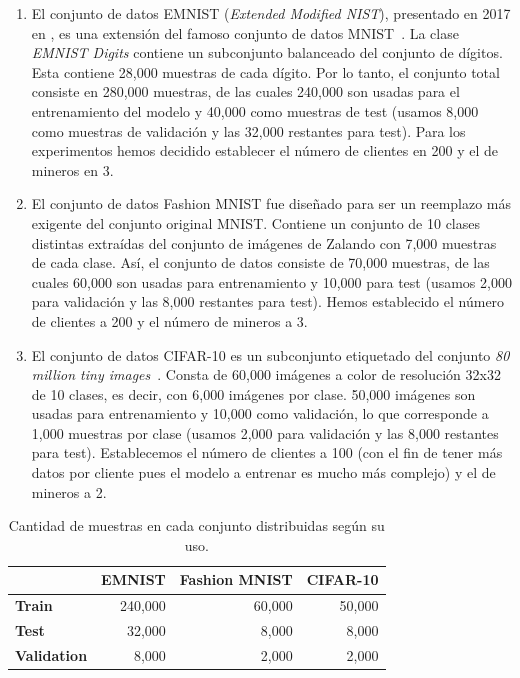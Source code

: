 \begin{enumerate}
    \item El conjunto de datos EMNIST (\textit{Extended Modified NIST}), presentado en 2017 en \cite{emnist}, es una extensión del famoso conjunto de datos MNIST~\cite{lecun-1998}. La clase \textit{EMNIST Digits} contiene un subconjunto balanceado del conjunto de dígitos. Esta contiene 28,000 muestras de cada dígito. Por lo tanto, el conjunto total consiste en 280,000 muestras, de las cuales 240,000 son usadas para el entrenamiento del modelo y 40,000 como muestras de test (usamos 8,000 como muestras de validación y las 32,000 restantes para test). Para los experimentos hemos decidido establecer el número de clientes en 200 y el de mineros en 3.
    
    \item El conjunto de datos Fashion MNIST \cite{fashionmnist-2017} fue diseñado para ser un reemplazo más exigente del conjunto original MNIST. Contiene un conjunto de 10 clases distintas extraídas del conjunto de imágenes de Zalando con 7,000 muestras de cada clase. Así, el conjunto de datos consiste de 70,000 muestras, de las cuales 60,000 son usadas para entrenamiento y 10,000 para test (usamos 2,000 para validación y las 8,000 restantes para test). Hemos establecido el número de clientes a 200 y el número de mineros a 3.

    \item El conjunto de datos CIFAR-10 es un subconjunto etiquetado del conjunto \textit{80 million tiny images}~\cite{torralba-2008}. Consta de 60,000 imágenes a color de resolución 32x32 de 10 clases, es decir, con 6,000 imágenes por clase. 50,000 imágenes son usadas para entrenamiento y 10,000 como validación, lo que corresponde a 1,000 muestras por clase (usamos 2,000 para validación y las 8,000 restantes para test). Establecemos el número de clientes a 100 (con el fin de tener más datos por cliente pues el modelo a entrenar es mucho más complejo) y el de mineros a 2.
\end{enumerate}


\begin{table}
    \centering
    \begin{tabular}{lrrr}
    \toprule
         &  \textbf{EMNIST}&  \textbf{Fashion MNIST}& \textbf{CIFAR-10}\\
         \toprule
         \textbf{Train}&  240,000&  60,000& 50,000\\
         \midrule
         \textbf{Test}&  32,000&  8,000& 8,000\\
         \midrule
         \textbf{Validation}&  8,000&  2,000& 2,000\\
         \bottomrule
    \end{tabular}
    \caption{Cantidad de muestras en cada conjunto distribuidas según su uso.}
    \label{tab:trainvaltest}
\end{table}

